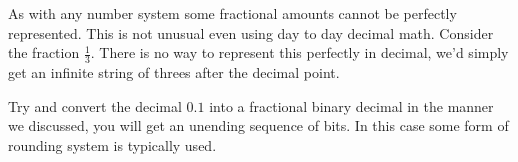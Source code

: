 \documentclass[12pt]{article}
\begin{document}
\newline
\newline
\newline
\par\noindent As with any number system some fractional amounts cannot be perfectly represented. This is not unusual even using day to day decimal math. Consider the fraction \(\frac{1}{3}\). There is no way to represent this perfectly in decimal, we'd simply get an infinite string of threes after the decimal point. 
\newline
\par\noindent Try and convert the decimal \(0.1\) into a fractional binary decimal in the manner we discussed, you will get an unending sequence of bits. In this case some form of rounding system is typically used.
\end{document}
